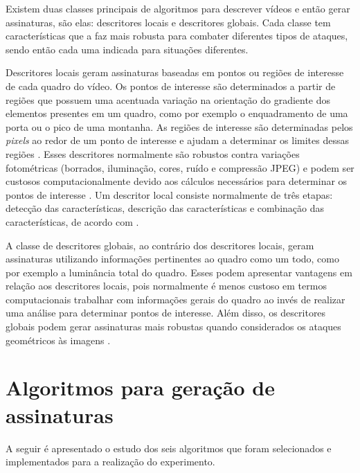 


    Existem duas classes principais de algoritmos para descrever vídeos e então gerar assinaturas, são elas: descritores locais e descritores globais. Cada classe tem características que a faz mais robusta para combater diferentes tipos de ataques, sendo então cada uma indicada para situações diferentes.
    
    Descritores locais geram assinaturas baseadas em pontos ou regiões de interesse de cada quadro do vídeo. Os pontos de interesse são determinados a partir de regiões que possuem uma acentuada variação na orientação do gradiente dos elementos presentes em um quadro, como por exemplo o enquadramento de uma porta ou o pico de uma montanha. As regiões de interesse são determinadas pelos \textit{pixels} ao redor de um ponto de interesse e ajudam a determinar os limites dessas regiões \citeauthor{radhakrishnan2007content}. Esses descritores normalmente são robustos contra variações fotométricas (borrados, iluminação, cores, ruído e compressão JPEG) e podem ser custosos computacionalmente devido aos cálculos necessários para determinar os pontos de interesse \citeauthor{naini2014vanishing}. Um descritor local consiste normalmente de três etapas: detecção das características, descrição das características e combinação das características, de acordo com \citeauthor{chen2010zernike}.

    A classe de descritores globais, ao contrário dos descritores locais, geram assinaturas utilizando informações pertinentes ao quadro como um todo, como por exemplo a luminância total do quadro. Esses podem apresentar vantagens em relação aos descritores locais, pois normalmente é menos custoso em termos computacionais trabalhar com informações gerais do quadro ao invés de realizar uma análise para determinar pontos de interesse. Além disso, os descritores globais podem gerar assinaturas mais robustas quando considerados os ataques geométricos às imagens \citeauthor{law2007video}. 
    
\section{Algoritmos para geração de assinaturas}
	A seguir é apresentado o estudo dos seis algoritmos que foram selecionados e implementados para a realização do experimento.


